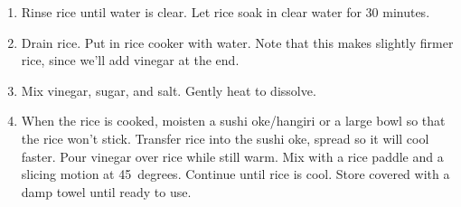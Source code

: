 
\begin{ingredients}
\end{ingredients}


\begin{recipe}
  \begin{enumerate}

  \item Rinse rice until water is clear.  Let rice soak in clear water for 30 minutes.
    
  \item Drain rice.  Put in rice cooker with water.  Note that this
    makes slightly firmer rice, since we'll add vinegar at the end.

  \item Mix vinegar, sugar, and salt.  Gently heat to dissolve.
    
  \item When the rice is cooked, moisten a sushi oke/hangiri or a
    large bowl so that the rice won't stick.  Transfer rice into the
    sushi oke, spread so it will cool faster.  Pour vinegar over rice
    while still warm.  Mix with a rice paddle and a slicing motion at
    45~degrees.  Continue until rice is cool.  Store covered with a
    damp towel until ready to use.

  \end{enumerate}
\end{recipe}

